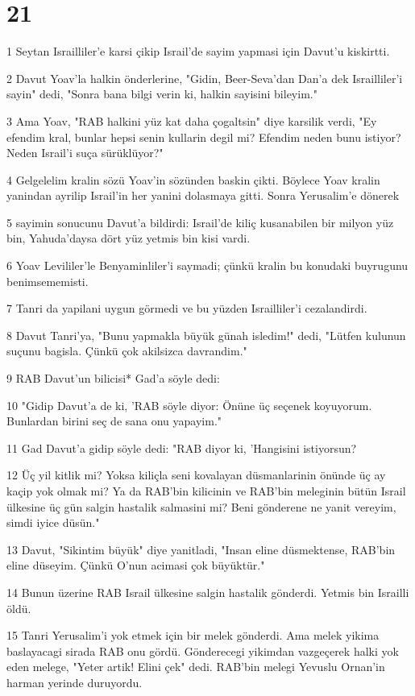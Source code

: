 \chapter{21}

\par 1 Seytan Israilliler'e karsi çikip Israil'de sayim yapmasi için Davut'u kiskirtti.
\par 2 Davut Yoav'la halkin önderlerine, "Gidin, Beer-Seva'dan Dan'a dek Israilliler'i sayin" dedi, "Sonra bana bilgi verin ki, halkin sayisini bileyim."
\par 3 Ama Yoav, "RAB halkini yüz kat daha çogaltsin" diye karsilik verdi, "Ey efendim kral, bunlar hepsi senin kullarin degil mi? Efendim neden bunu istiyor? Neden Israil'i suça sürüklüyor?"
\par 4 Gelgelelim kralin sözü Yoav'in sözünden baskin çikti. Böylece Yoav kralin yanindan ayrilip Israil'in her yanini dolasmaya gitti. Sonra Yerusalim'e dönerek
\par 5 sayimin sonucunu Davut'a bildirdi: Israil'de kiliç kusanabilen bir milyon yüz bin, Yahuda'daysa dört yüz yetmis bin kisi vardi.
\par 6 Yoav Levililer'le Benyaminliler'i saymadi; çünkü kralin bu konudaki buyrugunu benimsememisti.
\par 7 Tanri da yapilani uygun görmedi ve bu yüzden Israilliler'i cezalandirdi.
\par 8 Davut Tanri'ya, "Bunu yapmakla büyük günah isledim!" dedi, "Lütfen kulunun suçunu bagisla. Çünkü çok akilsizca davrandim."
\par 9 RAB Davut'un bilicisi* Gad'a söyle dedi:
\par 10 "Gidip Davut'a de ki, 'RAB söyle diyor: Önüne üç seçenek koyuyorum. Bunlardan birini seç de sana onu yapayim."
\par 11 Gad Davut'a gidip söyle dedi: "RAB diyor ki, 'Hangisini istiyorsun?
\par 12 Üç yil kitlik mi? Yoksa kiliçla seni kovalayan düsmanlarinin önünde üç ay kaçip yok olmak mi? Ya da RAB'bin kilicinin ve RAB'bin meleginin bütün Israil ülkesine üç gün salgin hastalik salmasini mi? Beni gönderene ne yanit vereyim, simdi iyice düsün."
\par 13 Davut, "Sikintim büyük" diye yanitladi, "Insan eline düsmektense, RAB'bin eline düseyim. Çünkü O'nun acimasi çok büyüktür."
\par 14 Bunun üzerine RAB Israil ülkesine salgin hastalik gönderdi. Yetmis bin Israilli öldü.
\par 15 Tanri Yerusalim'i yok etmek için bir melek gönderdi. Ama melek yikima baslayacagi sirada RAB onu gördü. Gönderecegi yikimdan vazgeçerek halki yok eden melege, "Yeter artik! Elini çek" dedi. RAB'bin melegi Yevuslu Ornan'in harman yerinde duruyordu.
